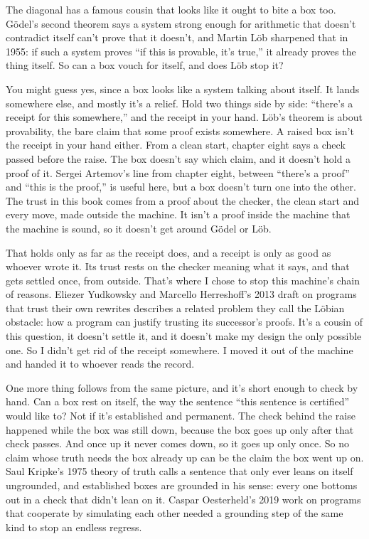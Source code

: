 \documentclass[11pt,twoside]{article}
\theoremstyle{thielethm}
\theoremstyle{thieledef}
\theoremstyle{thieledef}
\theoremstyle{thieledef}
\theoremstyle{thielethm}
\theoremstyle{thieleobs}
\theoremstyle{thielethm}
\begin{document}
The diagonal has a famous cousin that looks like it ought to bite a box too. Gödel's second theorem says a system strong enough for arithmetic that doesn't contradict itself can't prove that it doesn't, and Martin Löb sharpened that in 1955: if such a system proves ``if this is provable, it's true,'' it already proves the thing itself. So can a box vouch for itself, and does Löb stop it?

You might guess yes, since a box looks like a system talking about itself. It lands somewhere else, and mostly it's a relief. Hold two things side by side: ``there's a receipt for this somewhere,'' and the receipt in your hand. Löb's theorem is about provability, the bare claim that some proof exists somewhere. A raised box isn't the receipt in your hand either. From a clean start, chapter eight says a check passed before the raise. The box doesn't say which claim, and it doesn't hold a proof of it. Sergei Artemov's line from chapter eight, between ``there's a proof'' and ``this is the proof,'' is useful here, but a box doesn't turn one into the other. The trust in this book comes from a proof about the checker, the clean start and every move, made outside the machine. It isn't a proof inside the machine that the machine is sound, so it doesn't get around Gödel or Löb.

That holds only as far as the receipt does, and a receipt is only as good as whoever wrote it. Its trust rests on the checker meaning what it says, and that gets settled once, from outside. That's where I chose to stop this machine's chain of reasons. Eliezer Yudkowsky and Marcello Herreshoff's 2013 draft on programs that trust their own rewrites describes a related problem they call the Löbian obstacle: how a program can justify trusting its successor's proofs. It's a cousin of this question, it doesn't settle it, and it doesn't make my design the only possible one. So I didn't get rid of the receipt somewhere. I moved it out of the machine and handed it to whoever reads the record.

One more thing follows from the same picture, and it's short enough to check by hand. Can a box rest on itself, the way the sentence ``this sentence is certified'' would like to? Not if it's established and permanent. The check behind the raise happened while the box was still down, because the box goes up only after that check passes. And once up it never comes down, so it goes up only once. So no claim whose truth needs the box already up can be the claim the box went up on. Saul Kripke's 1975 theory of truth calls a sentence that only ever leans on itself ungrounded, and established boxes are grounded in his sense: every one bottoms out in a check that didn't lean on it. Caspar Oesterheld's 2019 work on programs that cooperate by simulating each other needed a grounding step of the same kind to stop an endless regress.
\end{document}
